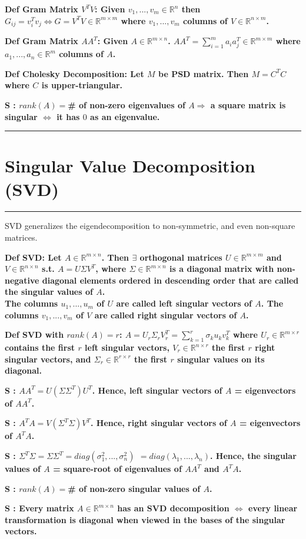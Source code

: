 \documentclass[7pt,landscape, margin = 0.1mm]{article}
\newcommand{\titellinie}{\rule{1.\linewidth}{0.75pt}}
\newcommand*{\mysection}[2][black]{\vskip 0pt \titellinie\vspace{-20pt}\section{#2}\vspace{-14pt}\titellinie \colorlet{chaptercolor}{#1}}
\newcommand{\DEF}[2]{\color{chaptercolor}\bf{Def #1}:\color{black}    \hspace{0.2cm} #2}
\newcommand{\SA}[2]{\color{chaptercolor}\bf{S #1}:\color{black}    \hspace{0.2cm} #2}
\begin{document}
\begin{multicols}{4}
\begin{flushleft}
{\DEF{Gram Matrix $V^TV$}{Given $v_1,...,v_m\in\mathbb{R}^n$ then $G_{ij}=v_i^Tv_j \Leftrightarrow G=V^TV\in\mathbb{R}^{m\times m}$ where $v_1,...,v_m$ columns of $V\in\mathbb{R}^{n\times m}$.}

\DEF{Gram Matrix $AA^T$}{Given $A\in\mathbb{R}^{m\times n}$. $AA^T=\sum_{i=1}^ma_ia_j^T\in\mathbb{R}^{m\times m}$ where $a_1,...,a_n\in\mathbb{R}^m$ columns of $A$.}

\DEF{Cholesky Decomposition}{Let $M$ be PSD matrix. Then $M=C^TC$ where $C$ is upper-triangular.}

\SA{}{$rank(A)=$\# of non-zero eigenvalues of $A \Rightarrow$ a square matrix is singular $\Leftrightarrow$ it has $0$ as an eigenvalue.}


\mysection[WildStrawberry]{\centering Singular Value Decomposition (SVD)}
SVD generalizes the eigendecomposition to non-symmetric, and even non-square matrices. 

\DEF{SVD}{Let $A\in\mathbb{R}^{m\times n}$. Then $\exists$ orthogonal matrices $U\in\mathbb{R}^{m\times m}$ and $V\in\mathbb{R}^{n\times n}$ s.t. $A=U\Sigma V^T$, where $\Sigma\in\mathbb{R}^{m\times n}$ is a diagonal matrix with non-negative diagonal elements ordered in descending order that are called the singular values of $A$.\\
The columns $u_1,...,u_m$ of $U$ are called left singular vectors of $A$. The columns $v_1,...,v_m$ of $V$ are called right singular vectors of $A$.}

\DEF{SVD with $rank(A)=r$}{$A=U_r\Sigma_rV_r^T=\sum_{k=1}^r\sigma_ku_kv_k^T$ where $U_r\in\mathbb{R}^{m\times r}$ contains the first $r$ left singular vectors, $V_r\in\mathbb{R}^{n\times r}$ the first $r$ right singular vectors, and $\Sigma_r\in\mathbb{R}^{r\times r}$ the first $r$ singular values on its diagonal.}

\SA{}{$AA^T=U(\Sigma\Sigma^T)U^T$. Hence, left singular vectors of $A$ = eigenvectors of $AA^T$.}

\SA{}{$A^TA=V(\Sigma^T\Sigma)V^T$. Hence, right singular vectors of $A$ = eigenvectors of $A^TA$.}

\SA{}{$\Sigma^T\Sigma = \Sigma\Sigma^T = diag(\sigma_1^2,...,\sigma_n^2)$ $ = diag(\lambda_1,...,\lambda_n)$. Hence, the singular values of $A$ = square-root of eigenvalues of $AA^T$ and $A^TA$.}

\SA{}{$rank(A)=$\# of non-zero singular values of $A$.}

\SA{}{Every matrix $A\in\mathbb{R}^{m\times n}$ has an SVD decomposition $\Leftrightarrow$ every linear transformation is diagonal when viewed in the bases of the singular vectors.}





}
\end{flushleft}
\end{multicols}
\end{document}
